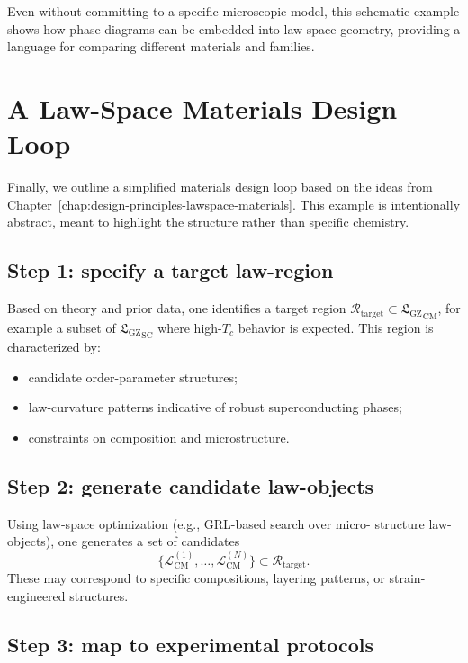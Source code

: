 \documentclass[11pt]{book}
\newcommand{\GZLS}{\ensuremath{\mathfrak{L}_{\mathrm{GZ}}}}
\theoremstyle{plain}
\theoremstyle{definition}
\theoremstyle{remark}
\begin{document}
Even without committing to a specific microscopic model, this
schematic example shows how phase diagrams can be embedded into
law-space geometry, providing a language for comparing different
materials and families.

\section{A Law-Space Materials Design Loop}
\label{sec:example-materials-design-loop}


Finally, we outline a simplified materials design loop based on the
ideas from Chapter~\ref{chap:design-principles-lawspace-materials}.
This example is intentionally abstract, meant to highlight the
structure rather than specific chemistry.

\subsection*{Step 1: specify a target law-region}

Based on theory and prior data, one identifies a target region
$\mathcal{R}_{\mathrm{target}} \subset {\GZLS}_{\mathrm{CM}}$, for
example a subset of ${\GZLS}_{\mathrm{SC}}$ where high-$T_c$ behavior
is expected. This region is characterized by:
\begin{itemize}
  \item candidate order-parameter structures;
  \item law-curvature patterns indicative of robust superconducting
        phases;
  \item constraints on composition and microstructure.
\end{itemize}

\subsection*{Step 2: generate candidate law-objects}

Using law-space optimization (e.g., GRL-based search over micro-
structure law-objects), one generates a set of candidates
\[
   \{\mathcal{L}_{\mathrm{CM}}^{(1)},\dots,
   \mathcal{L}_{\mathrm{CM}}^{(N)}\} \subset
   \mathcal{R}_{\mathrm{target}}.
\]
These may correspond to specific compositions, layering patterns, or
strain-engineered structures.

\subsection*{Step 3: map to experimental protocols}
\end{document}

